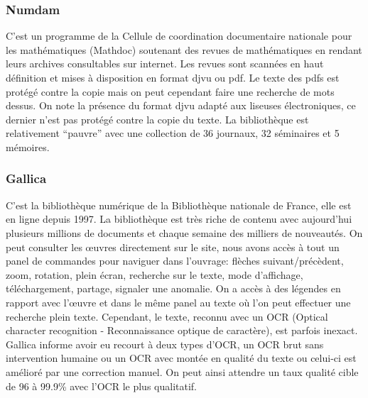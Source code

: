         \subsubsection{Numdam}
        \label{subsubsec:numdam}
        C’est un programme de la Cellule de coordination documentaire nationale pour les mathématiques (Mathdoc) soutenant des revues
        de mathématiques en rendant leurs archives consultables sur internet. Les revues sont scannées en haut définition et mises
        à disposition en format djvu ou pdf. Le texte des pdfs est protégé contre la copie mais on peut cependant faire
        une recherche de mots dessus. On note la présence du format djvu adapté aux liseuses électroniques, ce dernier n’est
        pas protégé contre la copie du texte. La bibliothèque est relativement “pauvre” avec une collection de 36 journaux, 32 séminaires et 5 mémoires.

        \subsubsection{Gallica}
        \label{subsubsec:gallica}
        C’est la bibliothèque numérique de la Bibliothèque nationale de France, elle est en ligne depuis 1997.
        La bibliothèque est très riche de contenu avec aujourd’hui plusieurs millions de documents
        et chaque semaine des milliers de nouveautés. On peut consulter les œuvres directement sur le site,
        nous avons accès à tout un panel de commandes pour naviguer dans l’ouvrage: flèches suivant/précèdent,
        zoom, rotation, plein écran, recherche sur le texte, mode d’affichage, téléchargement, partage,
        signaler une anomalie. On a accès à des légendes en rapport avec l’œuvre et dans le même panel
        au texte où l’on peut effectuer une recherche plein texte. Cependant, le texte, reconnu avec un OCR
        (Optical character recognition - Reconnaissance optique de caractère), est parfois inexact.
        Gallica informe avoir eu recourt à deux types d’OCR, un OCR brut sans intervention humaine ou un OCR
        avec montée en qualité du texte ou celui-ci est amélioré par une correction manuel. On peut ainsi
        attendre un taux qualité cible de 96 à 99.9\% avec l’OCR le plus qualitatif.

